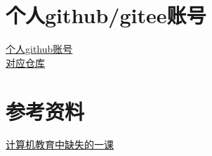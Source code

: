 \documentclass[UTF8]{ctexart}
\begin{document}
\section{个人github/gitee账号}
\href{https://github.com/sufwis}{个人github账号}\\
\indent \href{https://github.com/sufwis/development-tools-learn.git}{对应仓库}

\section{参考资料}
\href{https://missing-semester-cn.github.io/}{计算机教育中缺失的一课}
\end{document}
